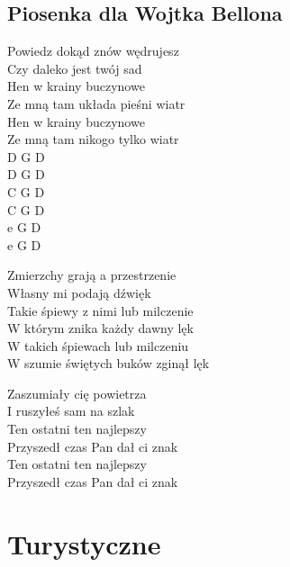 \documentclass{report}
\begin{document}
\section*{Piosenka dla Wojtka Bellona}
\begin{paracol}{2}
Powiedz dokąd znów wędrujesz\\
Czy daleko jest twój sad\\
Hen w krainy buczynowe\\
Ze mną tam układa pieśni wiatr\\
Hen w krainy buczynowe\\
Ze mną tam nikogo tylko wiatr\\

\switchcolumn
D G D\\
D G D\\
C G D\\
C G D\\
e G D\\
e G D\\

\end{paracol}
\begin{paracol}{2}
Zmierzchy grają a przestrzenie\\
Własny mi podają dźwięk\\
Takie śpiewy z nimi lub milczenie\\
W którym znika każdy dawny lęk\\
W takich śpiewach lub milczeniu\\
W szumie świętych buków zginął lęk\\

\switchcolumn

\end{paracol}
\begin{paracol}{2}
Zaszumiały cię powietrza\\
I ruszyłeś sam na szlak\\
Ten ostatni ten najlepszy\\
Przyszedł czas Pan dał ci znak\\
Ten ostatni ten najlepszy\\
Przyszedł czas Pan dał ci znak\\

\switchcolumn

\end{paracol}
\newpage
\chapter*{Turystyczne}
\end{document}
